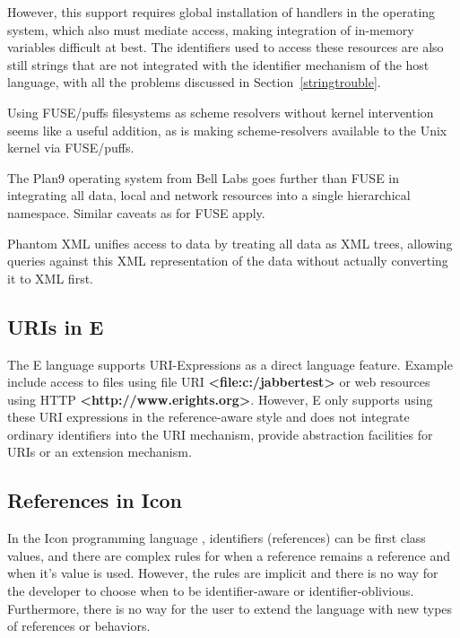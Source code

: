 \documentclass[preprint,authoryear]{acm_proc_article-sp}
\begin{document}
However, this support requires global installation of handlers in the operating
system, which also must mediate access, making integration of in-memory 
variables difficult at best.  The identifiers used to access these resources
are also still strings that are not integrated with the identifier mechanism of
the host language, with all the problems discussed in Section~\ref{stringtrouble}.

Using FUSE/puffs filesystems as scheme resolvers without kernel intervention seems
like a useful addition, as is making scheme-resolvers available to the Unix kernel
via FUSE/puffs.

The Plan9\cite{plan9names}\cite{plan9network} operating system from Bell Labs goes further than FUSE in integrating
all data, local and network resources into a single hierarchical namespace.  Similar
caveats as for FUSE apply.

Phantom XML\cite{phantomxml} unifies access to data by treating all data as
XML trees, allowing queries against this XML representation of the data without
actually converting it to XML first.  




\subsection{URIs in E}

The E language\cite{MillerRobustComposition}  supports URI-Expressions as a
direct language feature.  Example include access to files
using file URI  {\bf <file:c:/jabbertest>} or web resources using HTTP {\bf <http://www.erights.org>}.  However,
E only supports using these URI expressions in the reference-aware style and does not integrate 
ordinary identifiers into the URI mechanism, provide abstraction facilities 
for URIs or an extension mechanism. 


\subsection{References in Icon}

In the Icon programming language \cite{IconRef} , identifiers (references) can be first class values,
and there are complex rules for when a reference remains a reference and when
it's value is used.  However, the rules are implicit and there is no way for the 
developer to choose when to be identifier-aware or identifier-oblivious.  Furthermore,
there is no way for the user to extend the language with new types of references 
or behaviors.
\end{document}
